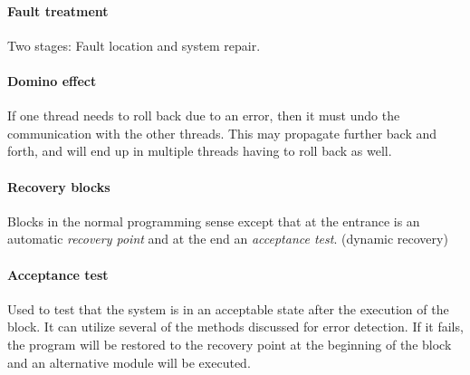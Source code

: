\paragraph{Fault treatment} Two stages: Fault location and system repair.

\paragraph{Domino effect} If one thread needs to roll back due to an error, then it must undo the communication with the other threads. This may propagate further back and forth, and will end up in multiple threads having to roll back as well.

\paragraph{Recovery blocks} Blocks in the normal programming sense except that at the entrance is an automatic \textit{recovery point} and at the end an \textit{acceptance test}. (dynamic recovery)


\paragraph{Acceptance test} Used to test that the system is in an acceptable state after the execution of the block. It can utilize several of the methods discussed for error detection. If it fails, the program will be restored to the recovery point at the beginning of the block and an alternative module will be executed.

